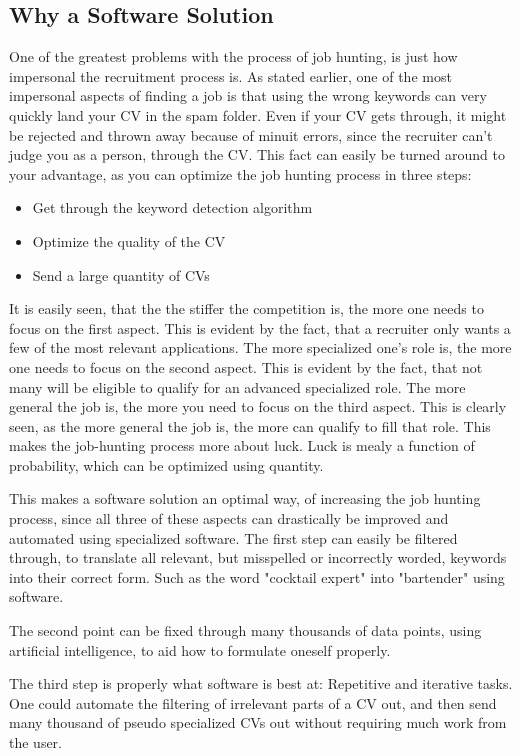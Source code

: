 \subsection{Why a Software Solution}
One of the greatest problems with the process of job hunting, is just how impersonal
the recruitment process is. As stated earlier, one of the most impersonal aspects
of finding a job is that using the wrong keywords can very
quickly land your CV in the spam folder.
Even if your CV gets through, it might be rejected and thrown away because of
minuit errors, since the recruiter can't judge you as a person, through the CV.
This fact can easily be turned around to your advantage, as you can optimize the
job hunting process in three steps:
\begin{itemize}
  \item Get through the keyword detection algorithm
  \item Optimize the quality of the CV
  \item Send a large quantity of CVs
\end{itemize}

It is easily seen, that the the stiffer the competition is, the more one 
needs to focus on the first aspect. This is evident by the fact, that a 
recruiter only wants a few of the most relevant applications.
The more specialized one's role is, the more one needs to focus on the second
aspect. This is evident by the fact, that not many will be eligible to qualify
for an advanced specialized role.
The more general the job is, the more you need to focus on the third
aspect. This is clearly seen, as the more general the job is, the more can 
qualify to fill that role. This makes the job-hunting process more about luck.
Luck is mealy a function of probability, which can be optimized using
quantity.

This makes a software solution an optimal way, of increasing the job hunting
process, since all three of these aspects can drastically be improved and automated
using specialized software. 
The first step can easily be filtered through, to translate all relevant, but
misspelled or incorrectly worded, keywords into their correct form. Such
as the word "cocktail expert" into "bartender" using software.

The second point can be fixed through many thousands of data points, using
artificial intelligence, to aid how to formulate oneself properly. 

The third step is properly what software is best at: Repetitive and iterative
tasks.
One could automate the filtering of irrelevant parts of a CV out, and then send
many thousand of pseudo specialized CVs out without requiring much work from the
user.

